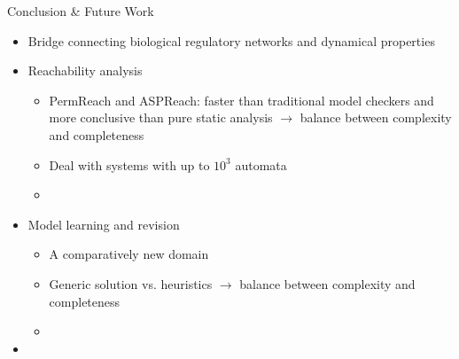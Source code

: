 \begin{frame}{Conclusion \& Future Work}
\begin{itemize}[<+->]
    \item Bridge connecting biological regulatory networks and dynamical properties
    \item Reachability analysis
    \begin{itemize}
        \item PermReach and ASPReach: faster than traditional model checkers and more conclusive than pure static analysis $\to$ balance between complexity and completeness
        \item Deal with systems with up to $10^3$ automata
        \item {}
    \end{itemize}
    \item Model learning and revision
    \begin{itemize}
        \item A comparatively new domain
        \item Generic solution vs. heuristics $\to$ balance between complexity and completeness
        \item {} 
    \end{itemize}
    \item {}
\end{itemize}
\end{frame}
